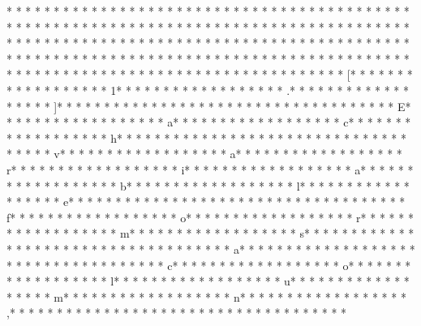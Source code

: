 * * *  * * *  * * *  *  * * *  *  * * *  * 	* * *  * * *  * * *  *  * * *  *  * * *  * 	* * *  * * *  * * *  *  * * *  *  * * *  * 	* * *  * * *  * * *  *  * * *  *  * * *  * * *  * * *  *  * * *  *  * * *  * * *  * * *  *  * * *  *  * * *  *  * * *  * * *  * * *  *  * * *  *  * * *  *  * * *  * * *  * * *  *  * * *  *  * * *  *  * * *  * * *  * * *  *  * * *  *  * * *  *  * * *  * * *  * * *  *  * * *  *  * * *  *  * * *  * * *  * * *  *  * * *  *  * * *  *  * * *  * * *  * * *  *  * * *  *  * * *  * [* * *  * * *  * * *  *  * * *  *  * * *  * 1* * *  * * *  * * *  *  * * *  *  * * *  * .* * *  * * *  * * *  *  * * *  *  * * *  * ]* * *  * * *  * * *  *  * * *  *  * * *  *  * * *  * * *  * * *  *  * * *  *  * * *  * E* * *  * * *  * * *  *  * * *  *  * * *  * a* * *  * * *  * * *  *  * * *  *  * * *  * c* * *  * * *  * * *  *  * * *  *  * * *  * h* * *  * * *  * * *  *  * * *  *  * * *  *  * * *  * * *  * * *  *  * * *  *  * * *  * v* * *  * * *  * * *  *  * * *  *  * * *  * a* * *  * * *  * * *  *  * * *  *  * * *  * r* * *  * * *  * * *  *  * * *  *  * * *  * i* * *  * * *  * * *  *  * * *  *  * * *  * a* * *  * * *  * * *  *  * * *  *  * * *  * b* * *  * * *  * * *  *  * * *  *  * * *  * l* * *  * * *  * * *  *  * * *  *  * * *  * e* * *  * * *  * * *  *  * * *  *  * * *  *  * * *  * * *  * * *  *  * * *  *  * * *  * f* * *  * * *  * * *  *  * * *  *  * * *  * o* * *  * * *  * * *  *  * * *  *  * * *  * r* * *  * * *  * * *  *  * * *  *  * * *  * m* * *  * * *  * * *  *  * * *  *  * * *  * s* * *  * * *  * * *  *  * * *  *  * * *  *  * * *  * * *  * * *  *  * * *  *  * * *  * a* * *  * * *  * * *  *  * * *  *  * * *  *  * * *  * * *  * * *  *  * * *  *  * * *  * c* * *  * * *  * * *  *  * * *  *  * * *  * o* * *  * * *  * * *  *  * * *  *  * * *  * l* * *  * * *  * * *  *  * * *  *  * * *  * u* * *  * * *  * * *  *  * * *  *  * * *  * m* * *  * * *  * * *  *  * * *  *  * * *  * n* * *  * * *  * * *  *  * * *  *  * * *  * ,* * *  * * *  * * *  *  * * *  *  * * *  *  * * *  * * *  * * *  *  * * *  *  * * *  * 
